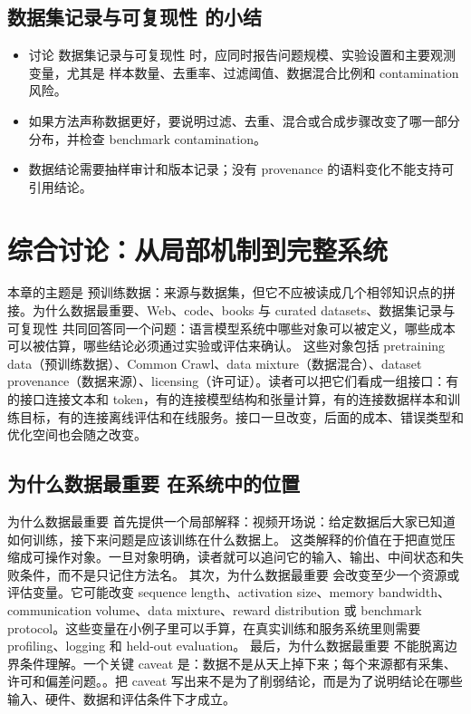 \documentclass[a4paper]{article}
\begin{document}
\subsection{数据集记录与可复现性 的小结}
\begin{itemize}
\item 讨论 数据集记录与可复现性 时，应同时报告问题规模、实验设置和主要观测变量，尤其是 样本数量、去重率、过滤阈值、数据混合比例和 contamination 风险。
\item 如果方法声称数据更好，要说明过滤、去重、混合或合成步骤改变了哪一部分分布，并检查 benchmark contamination。
\item 数据结论需要抽样审计和版本记录；没有 provenance 的语料变化不能支持可引用结论。
\end{itemize}
\section{综合讨论：从局部机制到完整系统}
本章的主题是 预训练数据：来源与数据集，但它不应被读成几个相邻知识点的拼接。为什么数据最重要、Web、code、books 与 curated datasets、数据集记录与可复现性 共同回答同一个问题：语言模型系统中哪些对象可以被定义，哪些成本可以被估算，哪些结论必须通过实验或评估来确认。
这些对象包括 pretraining data（预训练数据）、Common Crawl、data mixture（数据混合）、dataset provenance（数据来源）、licensing（许可证）。读者可以把它们看成一组接口：有的接口连接文本和 token，有的连接模型结构和张量计算，有的连接数据样本和训练目标，有的连接离线评估和在线服务。接口一旦改变，后面的成本、错误类型和优化空间也会随之改变。
\subsection{为什么数据最重要 在系统中的位置}
为什么数据最重要 首先提供一个局部解释：视频开场说：给定数据后大家已知道如何训练，接下来问题是应该训练在什么数据上。 这类解释的价值在于把直觉压缩成可操作对象。一旦对象明确，读者就可以追问它的输入、输出、中间状态和失败条件，而不是只记住方法名。
其次，为什么数据最重要 会改变至少一个资源或评估变量。它可能改变 sequence length、activation size、memory bandwidth、communication volume、data mixture、reward distribution 或 benchmark protocol。这些变量在小例子里可以手算，在真实训练和服务系统里则需要 profiling、logging 和 held-out evaluation。
最后，为什么数据最重要 不能脱离边界条件理解。一个关键 caveat 是：数据不是从天上掉下来；每个来源都有采集、许可和偏差问题。。把 caveat 写出来不是为了削弱结论，而是为了说明结论在哪些输入、硬件、数据和评估条件下才成立。
\end{document}
